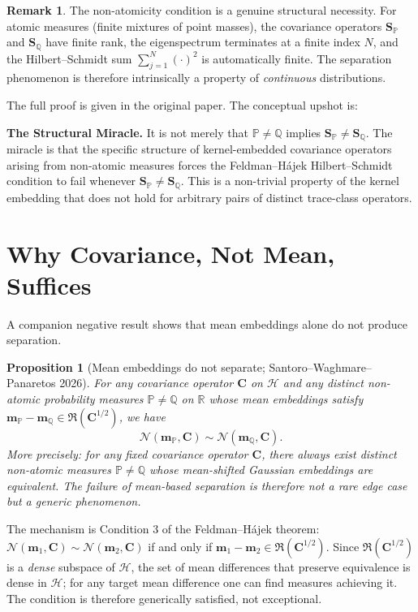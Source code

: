 \documentclass[12pt, oneside]{book}
\theoremstyle{plain}
\newtheorem{proposition}[theorem]{Proposition}
\theoremstyle{definition}
\newtheorem{remark}[theorem]{Remark}
\newcommand{\R}{\mathbb{R}}
\newcommand{\calH}{\mathcal{H}}
\newcommand{\calN}{\mathcal{N}}
\newcommand{\PP}{\mathbb{P}}
\newcommand{\QQ}{\mathbb{Q}}
\newcommand{\ran}{\mathfrak{R}}
\newcommand{\mP}{\mathbf{m}_{\PP}}
\newcommand{\mQ}{\mathbf{m}_{\QQ}}
\newcommand{\SP}{\mathbf{S}_{\PP}}
\newcommand{\SQ}{\mathbf{S}_{\QQ}}
\begin{document}
\begin{remark}
The non-atomicity condition is a genuine structural necessity. For atomic measures (finite mixtures of point masses), the covariance operators $\SP$ and $\SQ$ have finite rank, the eigenspectrum terminates at a finite index $N$, and the Hilbert--Schmidt sum $\sum_{j=1}^N (\cdot)^2$ is automatically finite. The separation phenomenon is therefore intrinsically a property of \emph{continuous} distributions.
\end{remark}

The full proof is given in the original paper. The conceptual upshot is:

\begin{highlightbox}
\textbf{The Structural Miracle.} It is not merely that $\PP \neq \QQ$ implies $\SP \neq \SQ$. The miracle is that the specific structure of kernel-embedded covariance operators arising from non-atomic measures forces the Feldman--H\'ajek Hilbert--Schmidt condition to fail whenever $\SP \neq \SQ$. This is a non-trivial property of the kernel embedding that does not hold for arbitrary pairs of distinct trace-class operators.
\end{highlightbox}

\section{Why Covariance, Not Mean, Suffices}

A companion negative result shows that mean embeddings alone do not produce separation.

\begin{proposition}[Mean embeddings do not separate; Santoro--Waghmare--Panaretos 2026]
\label{prop:mean_fail}
For any covariance operator $\mathbf{C}$ on $\calH$ and any distinct non-atomic probability measures $\PP \neq \QQ$ on $\R$ whose mean embeddings satisfy $\mP - \mQ \in \ran(\mathbf{C}^{1/2})$, we have
\begin{equation}
\calN(\mP, \mathbf{C}) \sim \calN(\mQ, \mathbf{C}).
\end{equation}
More precisely: for any fixed covariance operator $\mathbf{C}$, there always exist distinct non-atomic measures $\PP \neq \QQ$ whose mean-shifted Gaussian embeddings are equivalent. The failure of mean-based separation is therefore not a rare edge case but a generic phenomenon.
\end{proposition}

The mechanism is Condition 3 of the Feldman--H\'ajek theorem: $\calN(\mathbf{m}_1, \mathbf{C}) \sim \calN(\mathbf{m}_2, \mathbf{C})$ if and only if $\mathbf{m}_1 - \mathbf{m}_2 \in \ran(\mathbf{C}^{1/2})$. Since $\ran(\mathbf{C}^{1/2})$ is a \emph{dense} subspace of $\calH$, the set of mean differences that preserve equivalence is dense in $\calH$; for any target mean difference one can find measures achieving it. The condition is therefore generically satisfied, not exceptional.
\end{document}

